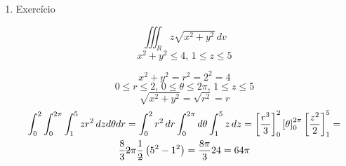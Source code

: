 \begin{enumerate}
	\item Exercício
	
	\begin{equation*}
		\iiint_R z \sqrt{x^2 + y^2}\, dv
	\end{equation*}
	\begin{equation*}
	x^2 + y^2 \leq 4,\, 1 \leq z \leq 5
	\end{equation*}
	
	\begin{equation*}
		x^2 + y^2 = r^2 = 2^2 = 4
	\end{equation*}
	\begin{equation*}
		0 \leq r \leq 2,\, 0 \leq \theta \leq 2\pi,\, 1 \leq z \leq 5
	\end{equation*}	
	\begin{equation*}
		\sqrt{x^2 + y^2} = \sqrt{r^2} = r
	\end{equation*}
	\begin{gather*}
		\int_0^2 \int_0^{2\pi} \int_1^5 zr^2\, dz d\theta dr = \int_0^2 r^2\, dr \int_0^{2\pi} d\theta \int_1^5 z\, dz = \left[\dfrac{r^3}{3}\right]_0^2 \left[\theta\right]_0^{2\pi} \left[\dfrac{z^2}{2}\right]_1^5 =\\ \dfrac{8}{3}\overstrike{2}\pi\dfrac{1}{\overstrike{2}}\left(5^2 - 1^2\right) = \dfrac{8\pi}{3}24 = 64\pi
	\end{gather*}
\end{enumerate}